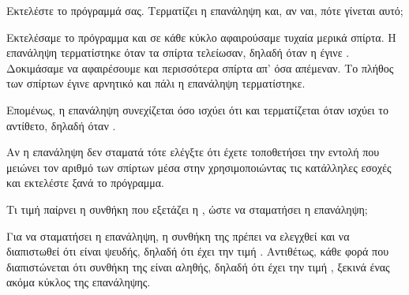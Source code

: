 \documentclass[a4paper,11pt,oneside]{book}
\begin{document}
\begin{step}
Εκτελέστε το πρόγραμμά σας. Τερματίζει η επανάληψη και, αν ναι, πότε γίνεται αυτό; 

\begin{answer}
Εκτελέσαμε το πρόγραμμα και σε κάθε κύκλο αφαιρούσαμε τυχαία μερικά σπίρτα. Η επανάληψη τερματίστηκε όταν τα σπίρτα τελείωσαν, δηλαδή όταν η  έγινε . Δοκιμάσαμε να αφαιρέσουμε και περισσότερα σπίρτα απ' όσα απέμεναν. Το πλήθος των σπίρτων έγινε αρνητικό και πάλι η επανάληψη τερματίστηκε. 

Επομένως, η επανάληψη συνεχίζεται όσο ισχύει ότι  και τερματίζεται όταν ισχύει το αντίθετο, δηλαδή όταν .
\end{answer}

\marginnote[16pt]{\iconcaution}
Αν η επανάληψη δεν σταματά τότε ελέγξτε ότι έχετε τοποθετήσει την εντολή που μειώνει τον αριθμό των σπίρτων  μέσα στην  χρησιμοποιώντας τις κατάλληλες εσοχές και εκτελέστε ξανά το πρόγραμμα. 

Τι τιμή παίρνει η συνθήκη που εξετάζει η , ώστε να σταματήσει η επανάληψη;

\begin{answer}
Για να σταματήσει η επανάληψη, η συνθήκη της  πρέπει να ελεγχθεί και να διαπιστωθεί ότι είναι ψευδής, δηλαδή ότι έχει την τιμή . Αντιθέτως, κάθε φορά που διαπιστώνεται ότι συνθήκη της  είναι αληθής, δηλαδή ότι έχει την τιμή , ξεκινά ένας ακόμα κύκλος της επανάληψης.
\end{answer}

\end{step}
\end{document}
